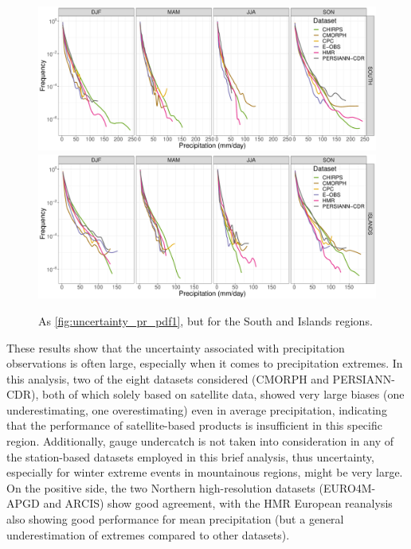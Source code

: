 \begin{figure}
    \centering
        \includegraphics[width=0.8\textheight]{figures/uncertainty/pdf_SOUTH_lines}
        \includegraphics[width=0.8\textheight]{figures/uncertainty/pdf_ISLANDS_lines}
    \decoRule
    \caption[Precipitation distribution (PDFs): uncertainty over Italy (2)]{
        As \cref{fig:uncertainty_pr_pdf1}, but for the South and Islands regions.
    }\label{fig:uncertainty_pr_pdf2}
\end{figure}

These results show that the uncertainty associated with precipitation observations is often large, especially when it comes to precipitation extremes. In this analysis, two of the eight datasets considered (CMORPH and PERSIANN-CDR), both of which solely based on satellite data, showed very large biases (one underestimating, one overestimating) even in average precipitation, indicating that the performance of satellite-based products is insufficient in this specific region. Additionally, gauge undercatch is not taken into consideration in any of the station-based datasets employed in this brief analysis, thus uncertainty, especially for winter extreme events in mountainous regions, might be very large. On the positive side, the two Northern high-resolution datasets (EURO4M-APGD and ARCIS) show good agreement, with the HMR European reanalysis also showing good performance for mean precipitation (but a general underestimation of extremes compared to other datasets).



